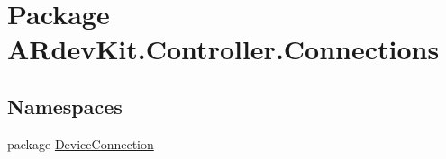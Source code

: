 \hypertarget{namespace_a_rdev_kit_1_1_controller_1_1_connections}{\section{Package A\-Rdev\-Kit.\-Controller.\-Connections}
\label{namespace_a_rdev_kit_1_1_controller_1_1_connections}
}
\subsection*{Namespaces}
\begin{DoxyCompactItemize}
\item 
package \hyperlink{namespace_a_rdev_kit_1_1_controller_1_1_connections_1_1_device_connection}{Device\-Connection}
\end{DoxyCompactItemize}
